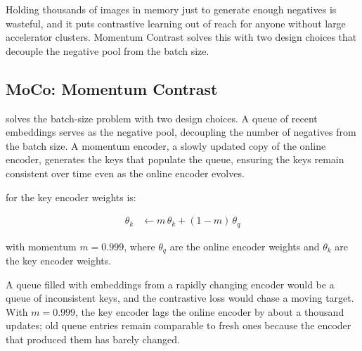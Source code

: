 
Holding thousands of images in memory just to generate enough negatives is wasteful, and it puts contrastive learning out of reach for anyone without large accelerator clusters.
Momentum Contrast solves this with two design choices that decouple the negative pool from the batch size.


\subsection{MoCo: Momentum Contrast}


\cite{He2020MoCo} solves the batch-size problem with two design choices.
A queue of recent embeddings serves as the negative pool, decoupling the number of negatives from the batch size.
A momentum encoder, a slowly updated copy of the online encoder, generates the keys that populate the queue, ensuring the keys remain consistent over time even as the online encoder evolves.

\cite{He2020MoCo} for the key encoder weights is:

\begin{align}
    \theta_k &\gets m\, \theta_k + (1 - m)\, \theta_q
    \label{eq:moco_update}
\end{align}

with momentum $m = 0.999$, where $\theta_q$ are the online encoder weights and $\theta_k$ are the key encoder weights.

A queue filled with embeddings from a rapidly changing encoder would be a queue of inconsistent keys, and the contrastive loss would chase a moving target.
With $m = 0.999$, the key encoder lags the online encoder by about a thousand updates; old queue entries remain comparable to fresh ones because the encoder that produced them has barely changed.

